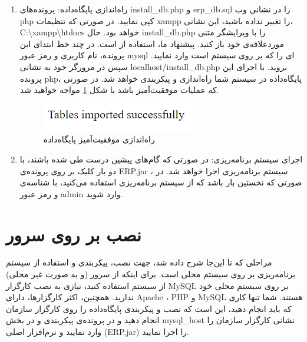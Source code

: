 \begin{enumerate}
		
	\item راه‌اندازی پایگاه‌داده:
	پرونده‌های install\_db.php و erp\_db.sql را در نشانی وب php کپی نمایید. در صورتی که تنظیمات xampp را تغییر نداده باشید، این نشانی، 
	  C:\textbackslash{}xampp\textbackslash{}htdocs خواهد بود. حال install\_db.php را با ویرایشگر متنی موردعلاقه‌ی خود باز کنید. پیشنهاد ما، استفاده از
	است. در چند خط ابتدای این پرونده، نام کاربری و رمز عبور mysql ای را که بر روی سیستم است وارد نمایید.
	 سپس در مرورگر خود به نشانی
	localhost/install\_db.php
	بروید. با اجرای این پرونده php، پایگاه‌داده در سیستم شما راه‌اندازی و پیکربندی خواهد شد. در صورتی که عملیات موفقیت‌آمیز باشد با شکل 
	\ref{f15}
	مواجه خواهید شد.
			\begin{figure}[H]
				\centering
				\includegraphics[scale=0.7]{img/install/db}
				\caption{راه‌اندازی موفقیت‌آمیز پایگاه‌داده}
				\label{f15}
			\end{figure}
	
	\item اجرای سیستم برنامه‌ریزی: 
در صورتی که گام‌های پیشین درست طی شده باشند، با دو بار کلیک بر روی پرونده‌ی ERP.jar ، سیستم برنامه‌ریزی اجرا خواهد شد. در صورتی که نخستین بار باشد که از سیستم برنامه‌ریزی استفاده می‌کنید، با  شناسه‌ی
  و رمز عبور admin وارد شوید. 
	
\end{enumerate}

\section{نصب بر روی سرور}
مراحلی که تا این‌جا شرح داده شد، جهت نصب، پیکربندی و استفاده از سیستم برنامه‌ریزی بر روی سیستم محلی است. برای اینکه از سرور (و به صورت غیر محلی) از سیستم استفاده کنید، نیازی به نصب کارگزار  MySQL بر روی سیستم محلی خود ندارید. همچنین، اکثر کارگزارها، دارای Apache ، PHP و  MySQL هستند. شما تنها کاری که باید انجام دهید، این است که نصب و پیکربندی پایگاه‌داده را روی کارگزار سازمان انجام دهید و در پرونده‌ی پیکربندی و در بخش  mysql\_host نشانی کارگزار سازمان را وارد نمایید و نرم‌افزار اصلی (ERP.jar) را اجرا نمایید.

